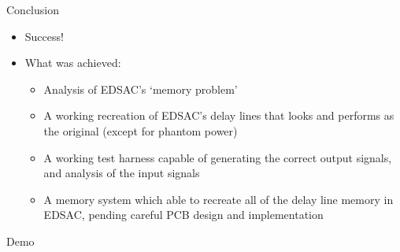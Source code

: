 \documentclass[aspectratio=169,11pt, xcolor={table}]{beamer}
\begin{document}
\begin{frame}{Conclusion}
	\begin{itemize}
		\item \alert{Success!}
		\item What was achieved:
		\begin{itemize}
		\item Analysis of EDSAC's `memory problem'
		\item A working recreation of EDSAC's delay lines that looks and performs as the original (except for phantom power)
		\item A working test harness capable of generating the correct output signals, and analysis of the input signals
		\item A memory system which able to recreate all of the delay line memory in EDSAC, pending careful PCB design and implementation 
		\end{itemize}
	\end{itemize}
\end{frame}

\begin{frame}[standout]
	Demo
\end{frame}
\end{document}
